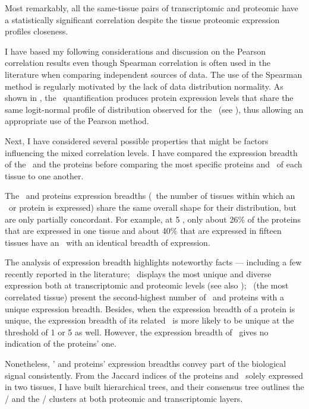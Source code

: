 Most remarkably,
all the same-tissue pairs of transcriptomic and proteomic
have a statistically significant correlation
despite the tissue proteomic expression profiles closeness.\mybr\

I have based my following considerations and discussion
on the Pearson correlation results
even though Spearman correlation is often used in the literature
when comparing independent sources of data.
The use of the Spearman method is regularly motivated
by the lack of data distribution normality.
As shown in ,
the \PPKM\ quantification produces protein expression levels
that share the same logit-normal profile of distribution
observed for the \mRNAs\ (see ),
thus allowing an appropriate use of the Pearson method.\mybr\

Next, I have considered several possible properties
that might be factors influencing the mixed correlation levels.
I have compared the expression breadth of the \mRNAs\ and the proteins
before comparing the most specific proteins and \mRNAs\ of each tissue
to one another.\mybr\

The \mRNAs\ and proteins expression breadths
(\ie\ the number of tissues within which an \mRNA\ or protein is expressed)
share the same overall shape for their distribution,
but are only partially concordant.
For example, at 5 \FPKM,
only about 26\% of the proteins that are expressed in one tissue
and about 40\% that are expressed in fifteen tissues have
an \mRNA\ with an identical breadth of expression.\mybr\

The analysis of expression breadth highlights noteworthy facts
--- including a few recently reported in the literature;
\testis\ displays the most unique and diverse expression
both at transcriptomic and proteomic levels
(see also \citet{Wang2019-ut,Zhang2015-yn});
\liver\ (the most correlated tissue) present the second-highest number
of \mRNAs\ and proteins with a unique expression breadth.
Besides, when the expression breadth of a protein is unique,
the expression breadth of its related \mRNA\ is more likely to be unique
at the threshold of 1 or 5 \FPKM{} as well.
However, the expression breadth of \mRNAs\ gives no indication
of the proteins' one.\mybr\

Nonetheless, \mRNAs{}' and proteins' expression breadths convey
part of the biological signal consistently.
From the Jaccard indices of the proteins and \mRNAs\
solely expressed in two tissues,
I have built hierarchical trees,
and their consensus tree outlines
the \ovary{}/\testis{} and the \kidney{}/\liver{} clusters
at both proteomic and transcriptomic layers.\mybr\

